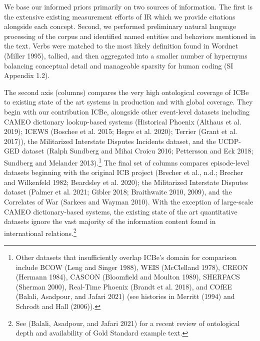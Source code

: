 \documentclass{article}
\renewcommand{\arraystretch}{0.8}
\begin{document}
We base our informed priors primarily on two sources of information. The
first is the extensive existing measurement efforts of IR which we
provide citations alongside each concept. Second, we performed
preliminary natural language processing of the corpus and identified
named entities and behaviors mentioned in the text. Verbs were matched
to the most likely definition found in Wordnet (Miller 1995), tallied,
and then aggregated into a smaller number of hypernyms balancing
conceptual detail and manageable sparsity for human coding (SI Appendix
1.2).

The second axis (columns) compares the very high ontological coverage of
ICBe to existing state of the art systems in production and with global
coverage. They begin with our contribution ICBe, alongside other
event-level datasets including CAMEO dictionary lookup-based systems
(Historical Phoenix (Althaus et al. 2019); ICEWS (Boschee et al. 2015;
Hegre et al. 2020); Terrier (Grant et al. 2017)), the Militarized
Interstate Disputes Incidents dataset, and the UCDP-GED dataset (Ralph
Sundberg and Mihai Croicu 2016; Pettersson and Eck 2018; Sundberg and
Melander 2013).\footnote{Other datasets that insufficiently overlap
  ICBe's domain for comparison include BCOW (Leng and Singer 1988), WEIS
  (McClelland 1978), CREON (Hermann 1984), CASCON (Bloomfield and
  Moulton 1989), SHERFACS (Sherman 2000), Real-Time Phoenix (Brandt et
  al. 2018), and COfEE (Balali, Asadpour, and Jafari 2021) (see
  histories in Merritt (1994) and Schrodt and Hall (2006)).} The final
set of columns compares episode-level datasets beginning with the
original ICB project (Brecher et al., n.d.; Brecher and Wilkenfeld 1982;
Beardsley et al. 2020); the Militarized Interstate Disputes dataset
(Palmer et al. 2021; Gibler 2018; Braithwaite 2010, 2009), and the
Correlates of War (Sarkees and Wayman 2010). With the exception of
large-scale CAMEO dictionary-based systems, the existing state of the
art quantitative datasets ignore the vast majority of the information
content found in international relations.\footnote{See (Balali,
  Asadpour, and Jafari 2021) for a recent review of ontological depth
  and availability of Gold Standard example text.}

\clearpage

\providecommand{\docline}[3]{\noalign{\global\setlength{\arrayrulewidth}{#1}}\arrayrulecolor[HTML]{#2}\cline{#3}}

\setlength{\tabcolsep}{2pt}

\renewcommand*{\arraystretch}{0.75}
\end{document}
